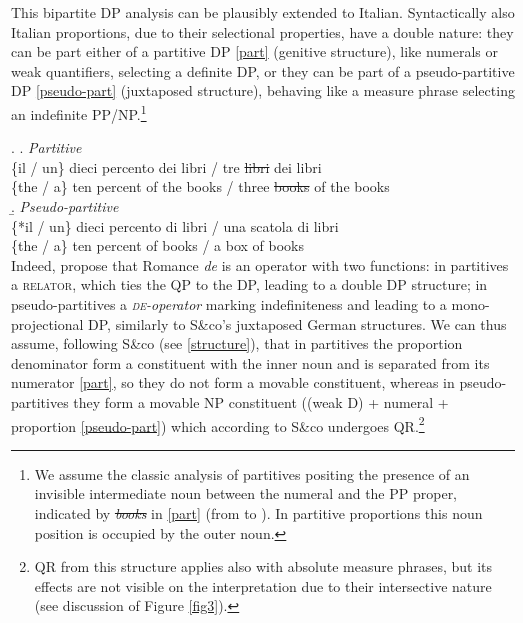\documentclass[charis, linguex]{glossa}
\begin{document}
This bipartite DP analysis can be plausibly extended to Italian. Syntactically also Italian proportions, due to their selectional properties, have a double nature: they can be part either of a partitive DP \ref{part} (genitive structure), like numerals or weak quantifiers, selecting a definite DP, or they can be part of a pseudo-partitive DP \ref{pseudo-part} (juxtaposed structure), behaving like a measure phrase selecting an indefinite PP/NP.\footnote{We assume the classic analysis of partitives positing the presence of an invisible intermediate noun between the numeral and the PP proper, indicated by \textit{\sout{books}} in \ref{part} (from \citealt{jac77} to \citealt{fal19}). In partitive proportions this noun position is occupied by the outer noun.} 

\ex. \a. \textit{Partitive} \label{part} \\
\gll \{il / un\} dieci percento dei libri / tre \sout{libri} dei libri \\ 
          \{the / a\} ten percent {of the} books / three \sout{books} {of the} books \\ 
     \b. \textit{Pseudo-partitive} \label{pseudo-part} \\
	 \gll \{*il / un\} dieci percento di libri / una scatola di libri \\
	       \{the / a\} ten percent of books / a box of books \\ 

Indeed, \citet{esp21} propose that Romance \textit{de} is an operator with two
functions: in partitives a \textsc{relator}, which ties the QP to the DP,
leading to a double DP structure; in pseudo-partitives a
\textit{\textsc{de}-operator} marking indefiniteness and leading to a
mono-projectional DP, similarly to S\&co's juxtaposed German structures. We can
thus assume, following S\&co (see \ref{structure}), that in partitives the proportion denominator
form a constituent with the inner noun and is separated from its numerator \ref{part}, so
they do not form a movable constituent, whereas in pseudo-partitives they form
a movable NP constituent ((weak D) + numeral + proportion \ref{pseudo-part})
which according to S\&co undergoes QR.\footnote{QR from this structure applies
also with absolute measure phrases, but its effects are not visible on the
interpretation due to their intersective nature (see discussion of Figure
\ref{fig3}).}
\end{document}
